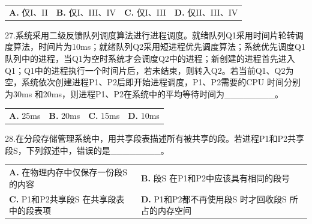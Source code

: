 \documentclass[UTF8,11pt]{ctexart}
\begin{document}
\begin{center}\begin{tabular}{>{\raggedright\arraybackslash}p{\dimexpr(\linewidth-8\tabcolsep)/4\relax}>{\raggedright\arraybackslash}p{\dimexpr(\linewidth-8\tabcolsep)/4\relax}>{\raggedright\arraybackslash}p{\dimexpr(\linewidth-8\tabcolsep)/4\relax}>{\raggedright\arraybackslash}p{\dimexpr(\linewidth-8\tabcolsep)/4\relax}}
\textbf{A.} 仅I、II & \textbf{B.} 仅I、III、IV & \textbf{C.} 仅I、III & \textbf{D.} 仅II、III、IV\\[.35em]\end{tabular}\end{center}

27.系统采用二级反馈队列调度算法进行进程调度。就绪队列Q1采用时间片轮转调度算法，时间片为10ms；就绪队列Q2采用短进程优先调度算法；系统优先调度Q1队列中的进程，当Q1为空时系统才会调度Q2中的进程；新创建的进程首先进入Q1；Q1中的进程执行一个时间片后，若未结束，则转入Q2。若当前Q1、Q2为空，系统依次创建进程P1、P2后即开始进程调度，P1、P2需要的CPU 时间分别为30ms 和20ms，则进程P1、P2在系统中的平均等待时间为\_\_\_\_\_\_\_\_。


\begin{center}\begin{tabular}{>{\raggedright\arraybackslash}p{\dimexpr(\linewidth-8\tabcolsep)/4\relax}>{\raggedright\arraybackslash}p{\dimexpr(\linewidth-8\tabcolsep)/4\relax}>{\raggedright\arraybackslash}p{\dimexpr(\linewidth-8\tabcolsep)/4\relax}>{\raggedright\arraybackslash}p{\dimexpr(\linewidth-8\tabcolsep)/4\relax}}
\textbf{A.} 25ms & \textbf{B.} 20ms & \textbf{C.} 15ms & \textbf{D.} 10ms\\[.35em]\end{tabular}\end{center}

28.在分段存储管理系统中，用共享段表描述所有被共享的段。若进程P1和P2共享段S，下列叙述中，错误的是\_\_\_\_\_\_\_\_。


\begin{center}\begin{tabular}{>{\raggedright\arraybackslash}p{\dimexpr(\linewidth-4\tabcolsep)/2\relax}>{\raggedright\arraybackslash}p{\dimexpr(\linewidth-4\tabcolsep)/2\relax}}
\textbf{A.} 在物理内存中仅保存一份段S 的内容 & \textbf{B.} 段S 在P1和P2中应该具有相同的段号\\[.35em]
\textbf{C.} P1和P2共享段S 在共享段表中的段表项 & \textbf{D.} P1和P2都不再使用段S 时才回收段S 所占的内存空间\\[.35em]\end{tabular}\end{center}
\end{document}
